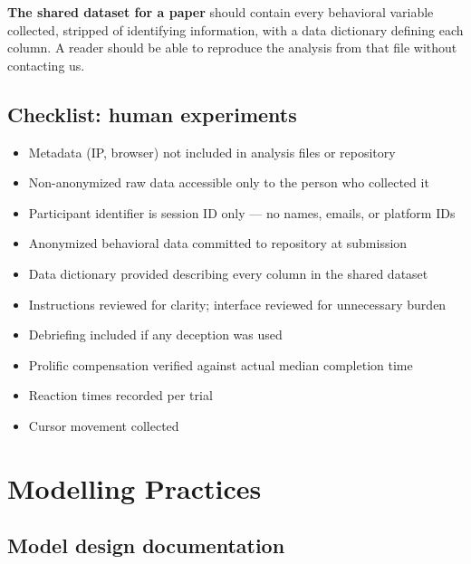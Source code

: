 \documentclass[11pt, letterpaper]{article}
\begin{document}
\textbf{The shared dataset for a paper} should contain every behavioral variable
collected, stripped of identifying information, with a data dictionary defining
each column. A reader should be able to reproduce the analysis from that file
without contacting us.

\subsection{Checklist: human experiments}

\begin{itemize}
  \item Metadata (IP, browser) not included in analysis files or repository
  \item Non-anonymized raw data accessible only to the person who collected it
  \item Participant identifier is session ID only --- no names, emails, or
    platform IDs
  \item Anonymized behavioral data committed to repository at submission
  \item Data dictionary provided describing every column in the shared dataset
  \item Instructions reviewed for clarity; interface reviewed for unnecessary burden
  \item Debriefing included if any deception was used
  \item Prolific compensation verified against actual median completion time
  \item Reaction times recorded per trial
  \item Cursor movement collected 
\end{itemize}


\section{Modelling Practices}
 
\subsection{Model design documentation}
 
\end{document}
